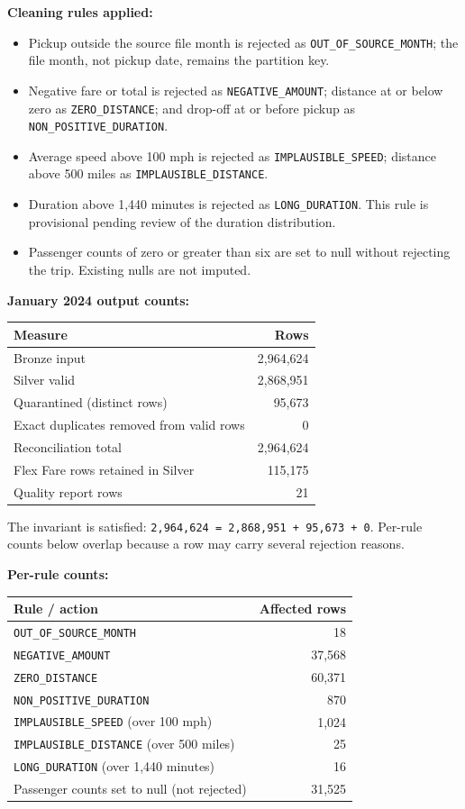 \documentclass[11pt,a4paper]{article}
\begin{document}
\textbf{Cleaning rules applied:}
\begin{itemize}
  \item Pickup outside the source file month is rejected as
        \texttt{OUT\_OF\_SOURCE\_MONTH}; the file month, not pickup date,
        remains the partition key.
  \item Negative fare or total is rejected as \texttt{NEGATIVE\_AMOUNT};
        distance at or below zero as \texttt{ZERO\_DISTANCE}; and drop-off at
        or before pickup as \texttt{NON\_POSITIVE\_DURATION}.
  \item Average speed above 100 mph is rejected as
        \texttt{IMPLAUSIBLE\_SPEED}; distance above 500 miles as
        \texttt{IMPLAUSIBLE\_DISTANCE}.
  \item Duration above 1,440 minutes is rejected as \texttt{LONG\_DURATION}.
        This rule is provisional pending review of the duration distribution.
  \item Passenger counts of zero or greater than six are set to null without
        rejecting the trip. Existing nulls are not imputed.
\end{itemize}

\textbf{January 2024 output counts:}
\begin{center}
\begin{tabular}{lr}
\hline
Measure & Rows \\
\hline
Bronze input & 2,964,624 \\
Silver valid & 2,868,951 \\
Quarantined (distinct rows) & 95,673 \\
Exact duplicates removed from valid rows & 0 \\
Reconciliation total & 2,964,624 \\
Flex Fare rows retained in Silver & 115,175 \\
Quality report rows & 21 \\
\hline
\end{tabular}
\end{center}
The invariant is satisfied:
\texttt{2,964,624 = 2,868,951 + 95,673 + 0}. Per-rule counts below overlap
because a row may carry several rejection reasons.

\textbf{Per-rule counts:}
\begin{center}
\begin{tabular}{lr}
\hline
Rule / action & Affected rows \\
\hline
\texttt{OUT\_OF\_SOURCE\_MONTH} & 18 \\
\texttt{NEGATIVE\_AMOUNT} & 37,568 \\
\texttt{ZERO\_DISTANCE} & 60,371 \\
\texttt{NON\_POSITIVE\_DURATION} & 870 \\
\texttt{IMPLAUSIBLE\_SPEED} (over 100 mph) & 1,024 \\
\texttt{IMPLAUSIBLE\_DISTANCE} (over 500 miles) & 25 \\
\texttt{LONG\_DURATION} (over 1,440 minutes) & 16 \\
Passenger counts set to null (not rejected) & 31,525 \\
\hline
\end{tabular}
\end{center}
\end{document}
